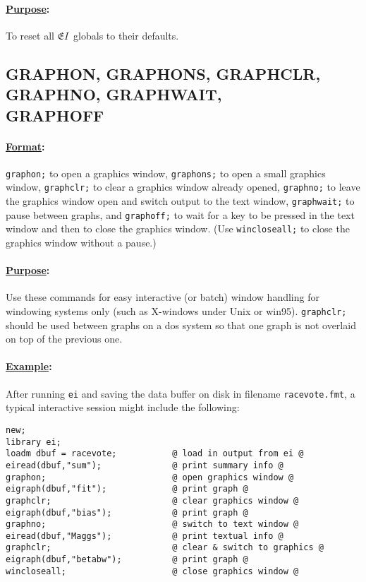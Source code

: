 \documentclass[11pt,titlepage]{article}
\newcommand{\EI}{\ensuremath{{\mathfrak EI}}}
\begin{document}
\paragraph{\underline{Purpose}:}
To reset all \EI\ globals to their defaults.

\subsection{GRAPHON, GRAPHONS, GRAPHCLR, GRAPHNO, GRAPHWAIT,\\
GRAPHOFF}
 \label{graph}

\paragraph{\underline{Format}:}
\texttt{graphon;} to open a graphics window, \texttt{graphons;} to
open a small graphics window, \texttt{graphclr;} to clear a graphics
window already opened, \texttt{graphno;} to leave the graphics window
open and switch output to the text window, \texttt{graphwait;} to
pause between graphs, and \texttt{graphoff;} to wait for a key to be
pressed in the text window and then to close the graphics window.
(Use \texttt{wincloseall;} to close the graphics window without a
pause.)

\paragraph{\underline{Purpose}:} Use these commands for easy
interactive (or batch) window handling for windowing systems only
(such as X-windows under Unix or win95).  \texttt{graphclr;} should be
used between graphs on a dos system so that one graph is not overlaid
on top of the previous one.

\paragraph{\underline{Example}:} After running \texttt{ei} and
saving the data buffer on disk in filename \texttt{racevote.fmt}, a
typical interactive session might include the following:
\begin{verbatim}
new;
library ei;
loadm dbuf = racevote;           @ load in output from ei @
eiread(dbuf,"sum");              @ print summary info @
graphon;                         @ open graphics window @
eigraph(dbuf,"fit");             @ print graph @
graphclr;                        @ clear graphics window @
eigraph(dbuf,"bias");            @ print graph @
graphno;                         @ switch to text window @
eiread(dbuf,"Maggs");            @ print textual info @
graphclr;                        @ clear & switch to graphics @
eigraph(dbuf,"betabw");          @ print graph @
wincloseall;                     @ close graphics window @
\end{verbatim}
\end{document}
